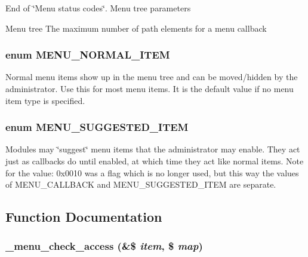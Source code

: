 End of \char`\"{}Menu status codes\char`\"{}.  Menu tree parameters

Menu tree The maximum number of path elements for a menu callback \hypertarget{group__menu_gc42144282c42a943b05511b38c451e4c}{
\subsubsection[{MENU\_\-NORMAL\_\-ITEM}]{\setlength{\rightskip}{0pt plus 5cm}enum {\bf MENU\_\-NORMAL\_\-ITEM}}}
\label{group__menu_gc42144282c42a943b05511b38c451e4c}


Normal menu items show up in the menu tree and can be moved/hidden by the administrator. Use this for most menu items. It is the default value if no menu item type is specified. \hypertarget{group__menu_g0860a2534ce61dc1334dc7ede68e20b3}{
\subsubsection[{MENU\_\-SUGGESTED\_\-ITEM}]{\setlength{\rightskip}{0pt plus 5cm}enum {\bf MENU\_\-SUGGESTED\_\-ITEM}}}
\label{group__menu_g0860a2534ce61dc1334dc7ede68e20b3}


Modules may \char`\"{}suggest\char`\"{} menu items that the administrator may enable. They act just as callbacks do until enabled, at which time they act like normal items. Note for the value: 0x0010 was a flag which is no longer used, but this way the values of MENU\_\-CALLBACK and MENU\_\-SUGGESTED\_\-ITEM are separate. 

\subsection{Function Documentation}
\hypertarget{group__menu_g255e3052e7679155b37b82d9bcbe19c9}{
\subsubsection[{\_\-menu\_\-check\_\-access}]{\setlength{\rightskip}{0pt plus 5cm}\_\-menu\_\-check\_\-access (\&\$ {\em item}, \/  \$ {\em map})}}
\label{group__menu_g255e3052e7679155b37b82d9bcbe19c9}


